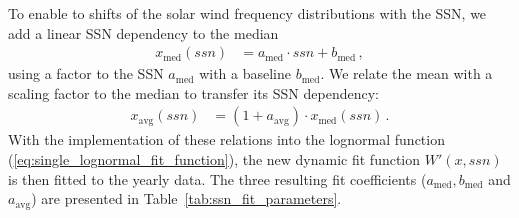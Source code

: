 To enable to shifts of the solar wind frequency distributions with the SSN, we add a linear SSN dependency to the median
\begin{align}
	x_\text{med}(ssn) &= a_\text{med} \cdot ssn + b_\text{med}\,,	\label{eq:median_with_ssn}
\end{align}
using a factor to the SSN $a_\text{med}$ with a baseline $b_\text{med}$. We relate the mean with a scaling factor to the median to transfer its SSN dependency:
\begin{align}
	x_\text{avg}(ssn) &= (1 + a_\text{avg}) \cdot x_\text{med}(ssn)\,.	\label{eq:mean_with_ssn}
\end{align}
With the implementation of these relations into the lognormal function (\ref{eq:single_lognormal_fit_function}), the new dynamic fit function $W'(x,ssn)$ is then fitted to the yearly data. The three resulting fit coefficients ($a_\text{med}, b_\text{med}$ and $a_\text{avg}$) are presented in Table~\ref{tab:ssn_fit_parameters}.
